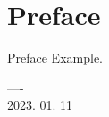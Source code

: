\thispagestyle{empty}
\chapter*{Preface}
Preface Example.

\makeatletter
\hfill ---- \@author\\ 
 \phantom{\rule{.8\linewidth+.1em}{0pt}}  2023. 01. 11
 \makeatother
\let\cleardoublepage\clearpage